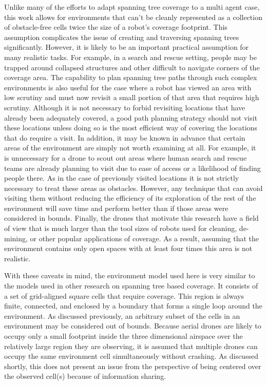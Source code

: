 Unlike many of the efforts to adapt spanning tree coverage to a multi agent case, this work allows for environments that can't be cleanly represented as a collection of obstacle-free cells twice the size of a robot's coverage footprint. This assumption complicates the issue of creating and traversing spanning trees significantly. However, it is likely to be an important practical assumption for many realistic tasks. For example, in a search and rescue setting, people may be trapped around collapsed structures and other difficult to navigate corners of the coverage area. The capability to plan spanning tree paths through such complex environments is also useful for the case where a robot has viewed an area with low scrutiny and must now revisit a small portion of that area that requires high scrutiny. Although it is not necessary to forbid revisiting locations that have already been adequately covered, a good path planning strategy should not visit these locations unless doing so is the most efficient way of covering the locations that do require a visit. In addition, it may be known in advance that certain areas of the environment are simply not worth examining at all. For example, it is unnecessary for a drone to scout out areas where human search and rescue teams are already planning to visit due to ease of access or a likelihood of finding people there. As in the case of previously visited locations it is not strictly necessary to treat these areas as obstacles. However, any technique that can avoid visiting them without reducing the efficiency of its exploration of the rest of the environment will save time and perform better than if those areas were considered in bounds. Finally, the drones that motivate this research have a field of view that is much larger than the tool sizes of robots used for cleaning, de-mining, or other popular applications of coverage. As a result, assuming that the environment contains only open spaces with at least four times this area is not realistic.

With these caveats in mind, the environment model used here is very similar to the models used in other research on spanning tree based coverage. It consists of a set of grid-aligned square cells that require coverage. This region is always finite, connected, and enclosed by a boundary that forms a single loop around the environment. As discussed previously, an arbitrary subset of the cells in an environment may be considered out of bounds. Because aerial drones are likely to occupy only a small footprint inside the three dimensional airspace over the relatively large region they are observing, it is assumed that multiple drones can occupy the same environment cell simultaneously without crashing. As discussed shortly, this does not present an issue from the perspective of being centered over the observed cell(s) because of information sharing.

